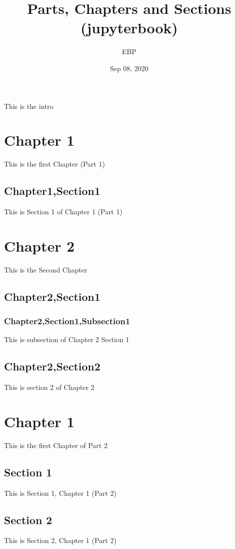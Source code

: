 \documentclass[letterpaper,10pt,english]{sphinxmanual}
\title{Parts, Chapters and Sections (jupyterbook)}
\date{Sep 08, 2020}
\author{EBP}
\begin{document}
\pagestyle{empty}
\sphinxmaketitle
\pagestyle{plain}
\sphinxtableofcontents
\pagestyle{normal}
\label{\detokenize{intro::doc}}


This is the intro


\chapter{Chapter 1}
\label{\detokenize{part1/chapter1:chapter-1}}\label{\detokenize{part1/chapter1::doc}}
This is the first Chapter (Part 1)


\section{Chapter1,Section1}
\label{\detokenize{part1/chapter1:chapter1-section1}}
This is Section 1 of Chapter 1 (Part 1)


\chapter{Chapter 2}
\label{\detokenize{part1/chapter2:chapter-2}}\label{\detokenize{part1/chapter2::doc}}
This is the Second Chapter


\section{Chapter2,Section1}
\label{\detokenize{part1/chapter2:chapter2-section1}}

\subsection{Chapter2,Section1,Subsection1}
\label{\detokenize{part1/chapter2:chapter2-section1-subsection1}}
This is subsection of Chapter 2 Section 1


\section{Chapter2,Section2}
\label{\detokenize{part1/chapter2:chapter2-section2}}
This is section 2 of Chapter 2


\chapter{Chapter 1}
\label{\detokenize{part2/chapter1:chapter-1}}\label{\detokenize{part2/chapter1::doc}}
This is the first Chapter of Part 2


\section{Section 1}
\label{\detokenize{part2/chapter1-section1:section-1}}\label{\detokenize{part2/chapter1-section1::doc}}
This is Section 1, Chapter 1 (Part 2)


\section{Section 2}
\label{\detokenize{part2/chapter1-section2:section-2}}\label{\detokenize{part2/chapter1-section2::doc}}
This is Section 2, Chapter 1 (Part 2)







\renewcommand{\indexname}{Index}
\printindex
\end{document}
